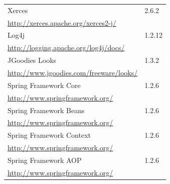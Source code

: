 \begin{table}[H]
\begin{tabular}{|l|l|}
  \hline
   \multicolumn{1}{|p{4.5in}|}{Xerces} &
   \multicolumn{1}{|p{0.6in}|}{2.6.2} \\
   \multicolumn{1}{|p{4.5in}|}{\footnotesize{\href{http://xerces.apache.org/xerces2-j/}{http://xerces.apache.org/xerces2-j/}}} &
   \multicolumn{1}{|p{0.6in}|}{} \\

  \hline
   \multicolumn{1}{|p{4.5in}|}{Log4j} &
   \multicolumn{1}{|p{0.6in}|}{1.2.12} \\
   \multicolumn{1}{|p{4.5in}|}{\footnotesize{\href{http://logging.apache.org/log4j/docs/}{http://logging.apache.org/log4j/docs/}}} &
   \multicolumn{1}{|p{0.6in}|}{} \\

  \hline
   \multicolumn{1}{|p{4.5in}|}{JGoodies Looks} &
   \multicolumn{1}{|p{0.6in}|}{1.3.2} \\
   \multicolumn{1}{|p{4.5in}|}{\footnotesize{\href{http://www.jgoodies.com/freeware/looks/}{http://www.jgoodies.com/freeware/looks/}}} &
   \multicolumn{1}{|p{0.6in}|}{} \\

  \hline
   \multicolumn{1}{|p{4.5in}|}{Spring Framework Core} &
   \multicolumn{1}{|p{0.6in}|}{1.2.6} \\
   \multicolumn{1}{|p{4.5in}|}{\footnotesize{\href{http://www.springframework.org/}{http://www.springframework.org/}}} &
   \multicolumn{1}{|p{0.6in}|}{} \\

  \hline
   \multicolumn{1}{|p{4.5in}|}{Spring Framework Beans} &
   \multicolumn{1}{|p{0.6in}|}{1.2.6} \\
   \multicolumn{1}{|p{4.5in}|}{\footnotesize{\href{http://www.springframework.org/}{http://www.springframework.org/}}} &
   \multicolumn{1}{|p{0.6in}|}{} \\

  \hline
   \multicolumn{1}{|p{4.5in}|}{Spring Framework Context} &
   \multicolumn{1}{|p{0.6in}|}{1.2.6} \\
   \multicolumn{1}{|p{4.5in}|}{\footnotesize{\href{http://www.springframework.org/}{http://www.springframework.org/}}} &
   \multicolumn{1}{|p{0.6in}|}{} \\

  \hline
   \multicolumn{1}{|p{4.5in}|}{Spring Framework AOP} &
   \multicolumn{1}{|p{0.6in}|}{1.2.6} \\
   \multicolumn{1}{|p{4.5in}|}{\footnotesize{\href{http://www.springframework.org/}{http://www.springframework.org/}}} &
   \multicolumn{1}{|p{0.6in}|}{} \\


\end{tabular}
\end{table}
